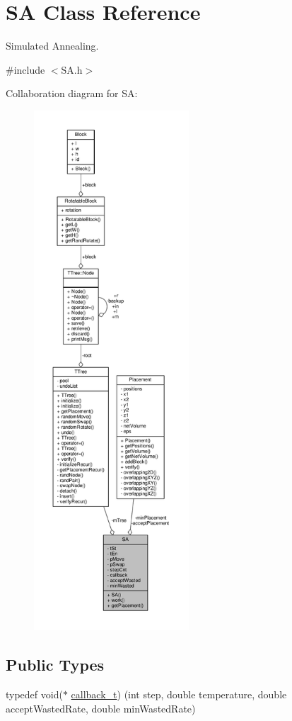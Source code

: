\hypertarget{classSA}{}\section{S\+A Class Reference}
\label{classSA}


Simulated Annealing.  




{\ttfamily \#include $<$S\+A.\+h$>$}



Collaboration diagram for S\+A\+:
\nopagebreak
\begin{figure}[H]
\begin{center}
\leavevmode
\includegraphics[height=550pt]{classSA__coll__graph}
\end{center}
\end{figure}
\subsection*{Public Types}
\begin{DoxyCompactItemize}
\item 
typedef void($\ast$ \hyperlink{classSA_a7aa15ea6b053d509ced8b7ae41609052}{callback\+\_\+t}) (int step, double temperature, double accept\+Wasted\+Rate, double min\+Wasted\+Rate)
\end{DoxyCompactItemize}
